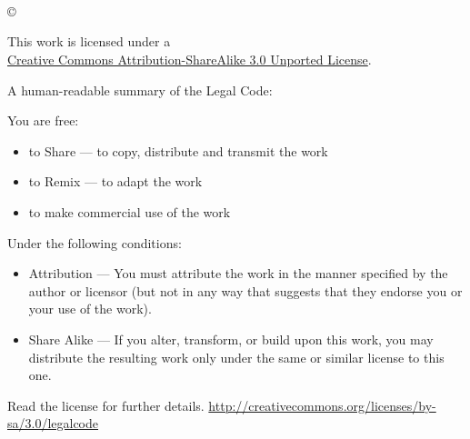 \thispagestyle{plain}
\begin{titlepage}

\begin{center}

\huge{\textbf{\titel}}\\[1.5ex]
\LARGE{\textbf{\untertitel}}\\[6ex]

\normalsize
\autor\\[1.2ex]
\copyright\ \jahr\\[9ex]

\end{center}

\singlespacing
\small
\noindent 
\begin{center}
This work is licensed under a \\ \href{http://creativecommons.org/licenses/by-sa/3.0/}{Creative Commons Attribution-ShareAlike 3.0 Unported License}.
\end{center}

A human-readable summary of the Legal Code:

You are free:
\begin{itemize}
\item to Share — to copy, distribute and transmit the work
\item to Remix — to adapt the work
\item to make commercial use of the work
\end{itemize}

Under the following conditions:
\begin{itemize}
\item Attribution — You must attribute the work in the manner specified by the author or licensor (but not in any way that suggests that they endorse you or your use of the work).
\item Share Alike — If you alter, transform, or build upon this work, you may distribute the resulting work only under the same or similar license to this one.
\end{itemize}

Read the license for further details.
\href{http://creativecommons.org/licenses/by-sa/3.0/legalcode}{http://creativecommons.org/licenses/by-sa/3.0/legalcode}

\end{titlepage}
